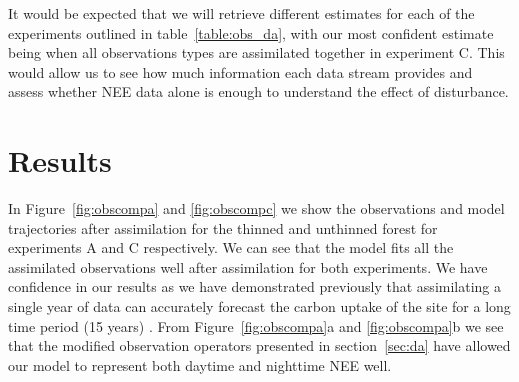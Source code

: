 It would be expected that we will retrieve different estimates for each of the experiments outlined in table~\ref{table:obs_da}, with our most confident estimate being when all observations types are assimilated together in experiment C. This would allow us to see how much information each data stream provides and assess whether NEE data alone is enough to understand the effect of disturbance.

\section{Results} \label{sec:results}

In Figure~\ref{fig:obscompa} and \ref{fig:obscompc} we show the observations and model trajectories after assimilation for the  thinned and unthinned forest for experiments A and C respectively. We can see that the model fits all the assimilated observations well after assimilation for both experiments. We have confidence in our results as we have demonstrated previously that assimilating a single year of data can accurately forecast the carbon uptake of the site for a long time period (15 years) \citep{Pinnington2016299}. From Figure~\ref{fig:obscompa}a and \ref{fig:obscompa}b we see that the modified observation operators presented in section~\ref{sec:da} have allowed our model to represent both daytime and nighttime NEE well. 

